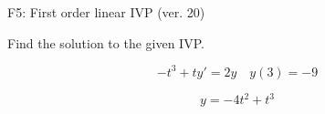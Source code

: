 \begin{exercise}
  \begin{exerciseTitle}F5: First order linear IVP (ver. 20)\end{exerciseTitle}
  \begin{exerciseStatement}
    
Find the solution to the given IVP.

    
\[-t^{3} +ty'= 2 y \hspace{1em} y( 3 ) = -9\]

  \end{exerciseStatement}
  \begin{exerciseAnswer}
    
\[y= -4 t^ 2 + t^{3}\]

  \end{exerciseAnswer}
\end{exercise}